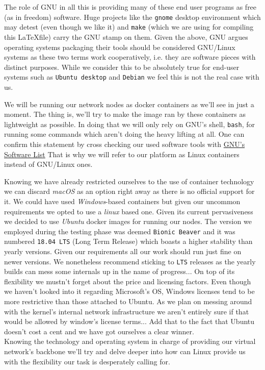                 The role of GNU in all this is providing many of these end user programs as free (as in freedom) software. Huge projects like the \texttt{gnome} desktop environment which may detest (even though we like it) and \texttt{make} (which we are using for compiling this \LaTeX file) carry the GNU stamp on them. Given the above, GNU argues operating systems packaging their tools should be considered GNU/Linux systems as these two terms work cooperatively, i.e. they are software pieces with distinct purposes. While we consider this to be absolutely true for end-user systems such as \texttt{Ubuntu desktop} and \texttt{Debian} we feel this is not the real case with us.

                We will be running our network nodes as docker containers as we'll see in just a moment. The thing is, we'll try to make the image ran by these containers as lightweight as possible. In doing that we will only rely on GNU's shell, \texttt{bash}, for running some commands which aren't doing the heavy lifting at all. One can confirm this statement by cross checking our used software tools with \href{https://www.gnu.org/software/software.html}{GNU's Software List} That is why we will refer to our platform as Linux containers instead of GNU/Linux ones.

            Knowing we have already restricted ourselves to the use of container technology we can discard \textit{macOS} as an option right away as there is no official support for it. We could have used \textit{Windows}-based containers but given our uncommon requirements we opted to use a \textit{linux} based one. Given its current pervasiveness we decided to use \textit{Ubuntu} docker images for running our nodes. The version we employed during the testing phase was deemed \texttt{Bionic Beaver} and it was numbered \texttt{18.04 LTS} (Long Term Release) which boasts a higher stability than yearly versions. Given our requirements all our work should run just fine on newer versions. We nonetheless recommend sticking to \texttt{LTS} releases as the yearly builds can mess some internals up in the name of progress... On top of its flexibility we mustn't forget about the price and licensing factors. Even though we haven't looked into it regarding Microsoft's OS, Windows licenses tend to be more restrictive than those attached to Ubuntu. As we plan on messing around with the kernel's internal network infrastructure we aren't entirely sure if that would be allowed by window's license terms... Add that to the fact that Ubuntu doesn't cost a cent and we have got ourselves a clear winner.\\

            Knowing the technology and operating system in charge of providing our virtual network's backbone we'll try and delve deeper into how can Linux provide us with the flexibility our task is desperately calling for.